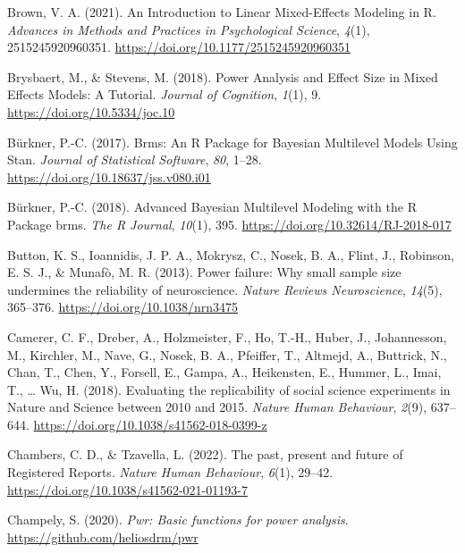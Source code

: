 \documentclass[
  man,
  floatsintext,
  longtable,
  a4paper,
  nolmodern,
  notxfonts,
  notimes,
  colorlinks=true,linkcolor=blue,citecolor=blue,urlcolor=blue]{apa7}
\newlength{\cslhangindent}
\newenvironment{CSLReferences}[2] %
 {\begin{list}{}{%
  \setlength{\itemindent}{0pt}
  \setlength{\leftmargin}{0pt}
  \setlength{\parsep}{0pt}
  \ifodd #1
   \setlength{\leftmargin}{\cslhangindent}
   \setlength{\itemindent}{-1\cslhangindent}
  \fi
  \setlength{\itemsep}{#2\baselineskip}}}
 {\end{list}}
\begin{document}
\begin{CSLReferences}{1}{0}
Brown, V. A. (2021). An {Introduction} to {Linear Mixed-Effects
Modeling} in {R}. \emph{Advances in Methods and Practices in
Psychological Science}, \emph{4}(1), 2515245920960351.
\url{https://doi.org/10.1177/2515245920960351}

Brysbaert, M., \& Stevens, M. (2018). Power {Analysis} and {Effect Size}
in {Mixed Effects Models}: {A Tutorial}. \emph{Journal of Cognition},
\emph{1}(1), 9. \url{https://doi.org/10.5334/joc.10}

Bürkner, P.-C. (2017). Brms: {An R Package} for {Bayesian Multilevel
Models Using Stan}. \emph{Journal of Statistical Software}, \emph{80},
1--28. \url{https://doi.org/10.18637/jss.v080.i01}

Bürkner, P.-C. (2018). Advanced {Bayesian Multilevel Modeling} with the
{R Package} brms. \emph{The R Journal}, \emph{10}(1), 395.
\url{https://doi.org/10.32614/RJ-2018-017}

Button, K. S., Ioannidis, J. P. A., Mokrysz, C., Nosek, B. A., Flint,
J., Robinson, E. S. J., \& Munafò, M. R. (2013). Power failure: Why
small sample size undermines the reliability of neuroscience.
\emph{Nature Reviews Neuroscience}, \emph{14}(5), 365--376.
\url{https://doi.org/10.1038/nrn3475}

Camerer, C. F., Dreber, A., Holzmeister, F., Ho, T.-H., Huber, J.,
Johannesson, M., Kirchler, M., Nave, G., Nosek, B. A., Pfeiffer, T.,
Altmejd, A., Buttrick, N., Chan, T., Chen, Y., Forsell, E., Gampa, A.,
Heikensten, E., Hummer, L., Imai, T., \ldots{} Wu, H. (2018). Evaluating
the replicability of social science experiments in {Nature} and
{Science} between 2010 and 2015. \emph{Nature Human Behaviour},
\emph{2}(9), 637--644. \url{https://doi.org/10.1038/s41562-018-0399-z}

Chambers, C. D., \& Tzavella, L. (2022). The past, present and future of
{Registered Reports}. \emph{Nature Human Behaviour}, \emph{6}(1),
29--42. \url{https://doi.org/10.1038/s41562-021-01193-7}

Champely, S. (2020). \emph{Pwr: Basic functions for power analysis}.
\url{https://github.com/heliosdrm/pwr}


\end{CSLReferences}
\end{document}
